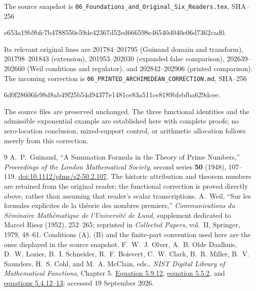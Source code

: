 \documentclass[11pt]{article}
\begin{document}
The source snapshot is
\texttt{06\_Foundations\_and\_Original\_Six\_Readers.tex}, SHA--256
\begin{center}\small\ttfamily
e653a19b9bfc7b4788550e59de42367d52ed666598e46540d040e06d7362cad0.
\end{center}
Its relevant original lines are 201784--201795 (Guinand domain and
transform), 201798--201843 (extension), 201953--202030 (expanded false
comparison), 202639--202660 (Weil conditions and regulator), and
202842--202906 (printed comparison).  The incoming correction is
\texttt{06\_PRINTED\_ARCHIMEDEAN\_CORRECTION.md}, SHA--256
\begin{center}\small\ttfamily
6d0f28606fe98d8ab49f25b54d94377e1481ce83a511ce8189bfebfba629dcee.
\end{center}
The source files are preserved unchanged.  The three functional identities
and the admissible exponential example are established here with complete
proofs; no zero-location conclusion, mixed-support control, or arithmetic
allocation follows merely from this correction.

\begin{thebibliography}{9}
A.~P.~Guinand, ``A Summation Formula in the Theory of Prime Numbers,''
\emph{Proceedings of the London Mathematical Society}, second series
\textbf{50} (1948), 107--119.
\href{https://doi.org/10.1112/plms/s2-50.2.107}{doi:10.1112/plms/s2-50.2.107}.
The historic attribution and theorem numbers are retained from the original
reader; the functional correction is proved directly above, rather than
assuming that reader's scalar transcriptions.
A.~Weil, ``Sur les formules explicites de la th\'eorie des nombres premiers,''
\emph{Communications du S\'eminaire Math\'ematique de l'Universit\'e de Lund},
supplement dedicated to Marcel Riesz (1952), 252--265; reprinted in
\emph{Collected Papers}, vol.~II, Springer, 1979, 48--61.
Conditions (A), (B) and the finite-part convention used here are the ones
displayed in the source snapshot.
F.~W.~J. Olver, A.~B. Olde Daalhuis, D.~W. Lozier, B.~I. Schneider,
R.~F. Boisvert, C.~W. Clark, B.~R. Miller, B.~V. Saunders, H.~S. Cohl,
and M.~A. McClain, eds., \emph{NIST Digital Library of Mathematical
Functions}, Chapter 5.
\href{https://dlmf.nist.gov/5.9.E12}{Equation 5.9.12},
\href{https://dlmf.nist.gov/5.5.E2}{equation 5.5.2}, and
\href{https://dlmf.nist.gov/5.4}{equations 5.4.12--13};
accessed 19 September 2026.
\end{thebibliography}
\end{document}
